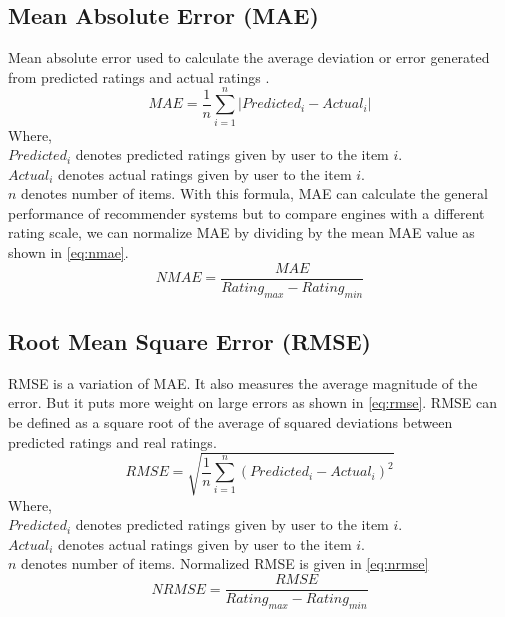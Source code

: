 \subsection{Mean Absolute Error (MAE)}
Mean absolute error used to calculate the average deviation or error generated from predicted ratings and actual ratings \cite{26}.
\begin{equation}
MAE = \frac{1}{n} \sum_{i=1}^{n}{\vert{Predicted_i - Actual_i} \vert}
\label{eq:mae}
\end{equation}
\noindent Where, \\ 
$Predicted_i$ \textsf{ denotes predicted ratings given by user to the item} $i.$ \\
$Actual_i$ \textsf{ denotes actual ratings given by user to the item } $i.$ \\
$n$ \textsf{denotes number of items.}
\noindent With this formula, MAE can calculate the general performance of recommender systems but to compare engines with a different rating scale, we can normalize MAE by dividing by the mean MAE value as shown in \autoref{eq:nmae}. 
\begin{equation}
NMAE = \frac{MAE} {Rating_{max} - Rating_{min}}
\label{eq:nmae}
\end{equation}


\subsection{Root Mean Square Error (RMSE)}
RMSE is a variation of MAE. It also measures the average magnitude of the error. But it puts more weight on large errors as shown in \autoref{eq:rmse}. RMSE can be defined as a square root of the average of squared deviations between predicted ratings and real ratings.
\begin{equation}
RMSE = \sqrt{ \frac{1}{n} \sum_{i=1}^{n}{({Predicted_i - Actual_i} ) ^ {2}}}
\label{eq:rmse}
\end{equation}
\noindent Where, \\
$Predicted_i$ \textsf{ denotes predicted ratings given by user to the item} $i.$ \\
$Actual_i$ \textsf{ denotes actual ratings given by user to the item } $i.$ \\
$n$ \textsf{denotes number of items.}
\noindent Normalized RMSE is given in \autoref{eq:nrmse}
\begin{equation}
NRMSE = \frac{RMSE} {Rating_{max} - Rating_{min}}
\label{eq:nrmse}
\end{equation}

